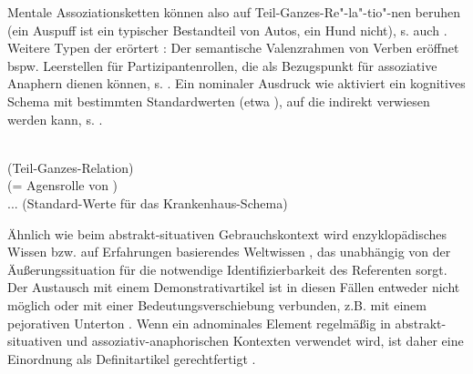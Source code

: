  \begin{exe}
	\ex \label{ex:asso2}   
	\begin{xlist}
		\ex \label{ex:auspuff}  
		\ex \label{ex:hund} 
		\end{xlist}
\end{exe}

Mentale Assoziationsketten können also auf Teil-Ganzes-Re"-la"-tio"-nen beruhen (ein Auspuff ist ein typischer Bestandteil von Autos, ein Hund nicht), s. auch . Weitere Typen der  erörtert \textcite[98--122]{Schwarz2000}: Der semantische Valenzrahmen von Verben eröffnet bspw. Leerstellen für Partizipantenrollen, die als Bezugspunkt für assoziative Anaphern dienen können, s. . Ein nominaler Ausdruck wie  aktiviert ein kognitives Schema mit bestimmten Standardwerten (etwa ), auf die indirekt verwiesen werden kann, s. . 

\begin{exe}
	\ex \label{ex:asso3}   
	\begin{xlist}
		\ex \label{ex:meronymie}  \\  (Teil-Ganzes-Relation)
		\ex \label{ex:rolle}  \\  (= Agensrolle von ) \object{fordern ein hohes Lösegeld.}
				\ex \label{ex:krank}  \\ ... (Standard-Werte für das Krankenhaus-Schema)
		\end{xlist}
\end{exe}

Ähnlich wie beim abstrakt-situativen Gebrauchskontext wird enzyklopädisches Wissen bzw. auf Erfahrungen basierendes Weltwissen , das unabhängig von der Äußerungssituation für die notwendige Identifizierbarkeit des Referenten sorgt. Der Austausch mit einem Demonstrativartikel ist in diesen Fällen entweder nicht möglich oder mit einer Bedeutungsverschiebung verbunden, z.B. mit einem pejorativen Unterton \parencite[989]{Hauenschild1993}. Wenn ein adnominales Element regelmäßig in abstrakt-situativen und assoziativ-anaphorischen Kontexten verwendet wird, ist daher eine Einordnung als Definitartikel gerechtfertigt \parencite[190]{Himmelmann1997}.

